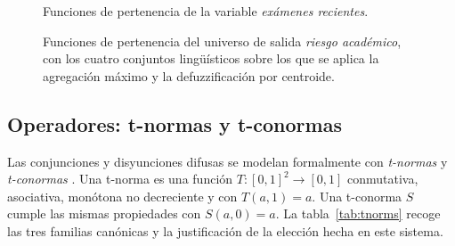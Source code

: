 \begin{figure}[H]
  \centering
  \caption{Funciones de pertenencia de la variable \emph{exámenes recientes}.}
  \label{fig:mf-exams}
\end{figure}

\begin{figure}[H]
  \centering
  \caption{Funciones de pertenencia del universo de salida \emph{riesgo académico}, con los cuatro conjuntos lingüísticos sobre los que se aplica la agregación máximo y la defuzzificación por centroide.}
  \label{fig:mf-risk}
\end{figure}

\subsection{Operadores: t-normas y t-conormas}
\label{sec:tnorms}

Las conjunciones y disyunciones difusas se modelan formalmente con \emph{t-normas} y \emph{t-conormas} \citep{klir1995fuzzy}. Una t-norma es una función $T:[0,1]^2\to[0,1]$ conmutativa, asociativa, monótona no decreciente y con $T(a,1)=a$. Una t-conorma $S$ cumple las mismas propiedades con $S(a,0)=a$. La tabla~\ref{tab:tnorms} recoge las tres familias canónicas y la justificación de la elección hecha en este sistema.

